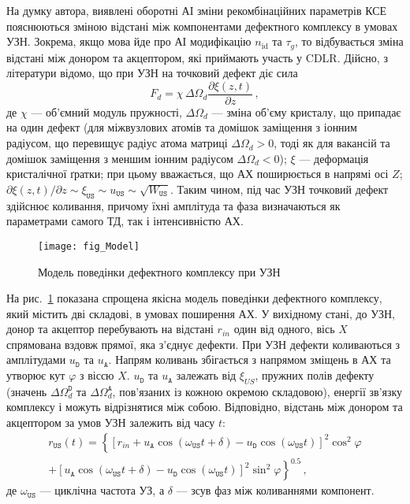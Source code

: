 На думку автора, виявлені оборотні АІ зміни рекомбінаційних параметрів КСЕ пояснюються зміною
відстані між компонентами дефектного комплексу в умовах УЗН.
Зокрема, якщо мова йде про АІ модифікацію $n_{\mathrm{id}}$ та $\tau_g$,
то відбувається зміна відстані між донором та акцептором, які приймають участь у CDLR.
Дійсно, з літератури \cite{MirzadeJAP2011,PELESHCHAK:UPJ2016} відомо, що при УЗН на точковий дефект діє сила
\begin{equation}
\label{eqFd}
F_d=\chi\,\Delta\Omega_d\frac{\partial \xi(z,t)}{\partial z}\,,
\end{equation}
де
$\chi$ --- об'ємний модуль пружності,
$\Delta\Omega_d$ --- зміна об'єму кристалу, що припадає на один дефект
(для міжвузлових атомів та домішок заміщення з іонним радіусом, що перевищує радіус атома матриці $\Delta\Omega_d > 0$,
тоді як для вакансій та домішок заміщення з меншим іонним радіусом $\Delta\Omega_d < 0$);
$\xi$ --- деформація кристалічної ґратки;
при цьому вважається, що АХ поширюється в напрямі осі $Z$;
$\partial \xi(z,t)/\partial z\sim \xi_{\mathtt{US}}\sim u_\mathtt{US} \sim \sqrt{W_\mathtt{US}}$.
Таким чином, під час УЗН точковий дефект здійснює коливання, причому їхні амплітуда та фаза визначаються як параметрами самого ТД, так і інтенсивністю АХ.


\begin{figure}[b]
\center
\texttt{[image: fig\_Model]}
\caption{\label{fig_Model}
Модель поведінки дефектного комплексу при УЗН
}%
\end{figure}

На рис.~\ref{fig_Model} показана спрощена якісна модель поведінки дефектного комплексу, який містить дві складові,
в умовах поширення АХ.
У вихідному стані, до УЗН, донор та акцептор перебувають на відстані $r_{in}$ один від одного,
вісь $X$ спрямована вздовж прямої, яка з'єднує дефекти.
При УЗН дефекти коливаються з амплітудами $u_\mathtt{D}$ та $u_\mathtt{A}$.
Напрям коливань збігається з напрямом зміщень в АХ та утворює кут $\varphi$ з віссю $X$.
$u_\mathtt{D}$ та $u_\mathtt{A}$ залежать від $\xi_{U\!S}$, пружних полів дефекту (значень $\Delta\Omega_d^\mathtt{D}$ та $\Delta\Omega_d^\mathtt{A}$,
пов'язаних із кожною окремою складовою), енергії зв'язку комплексу і можуть відрізнятися між собою.
Відповідно, відстань між донором та акцептором за умов УЗН залежить від часу $t$:
\begin{multline}
\label{eqrUS}
r_\mathtt{US}(t)=\left\{[r_{in}+u_\mathtt{A}\cos(\omega_\mathtt{US}t+\delta)-u_\mathtt{D}\cos(\omega_\mathtt{US}t)]^2\cos^2\varphi \right.\\
    \left.+ [u_\mathtt{A}\cos(\omega_\mathtt{US}t+\delta)-u_\mathtt{D}\cos(\omega_\mathtt{US}t)]^2\sin^2\varphi\right\}^{0.5}\,,
\end{multline}
де
$\omega_\mathtt{US}$ --- циклічна частота УЗ, а
$\delta$ --- зсув фаз між коливаннями компонент.

